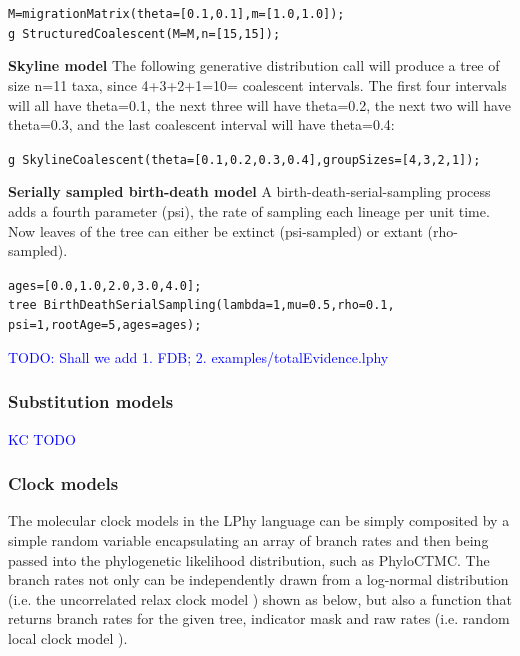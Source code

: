 \documentclass[10pt,letterpaper,table]{article}
\begin{document}
{{\small
  \begin{alltt}
  M = migrationMatrix(theta=[0.1, 0.1], m=[1.0, 1.0]);
  g ~ StructuredCoalescent(M=M, n=[15, 15]);
  \end{alltt}
}

\noindent{} \textbf{Skyline model}
\newline
The following generative distribution call will produce a tree of size
n=11 taxa, since 4+3+2+1=10= coalescent intervals.
The first four intervals will all have theta=0.1, the next three will
have theta=0.2, the next two will have theta=0.3, and the last
coalescent interval will have theta=0.4:

{\small
  \begin{alltt}
    g ~ SkylineCoalescent(theta=[0.1, 0.2, 0.3, 0.4], groupSizes=[4,3,2,1]);
  \end{alltt}
}

\noindent{} \textbf{Serially sampled birth-death model}
\newline
A birth-death-serial-sampling \cite{stadler2013dating} process adds a fourth parameter (psi), the rate of sampling each lineage per unit time.
Now leaves of the tree can either be extinct (psi-sampled) or extant (rho-sampled).
{\small
  \begin{alltt}
    ages = [0.0,1.0,2.0,3.0,4.0];
    tree ~ BirthDeathSerialSampling(lambda=1, mu=0.5, rho=0.1, 
                                    psi=1, rootAge=5, ages=ages);
  \end{alltt}
}

\textcolor{blue}{TODO: Shall we add 1. FDB; 2. examples/totalEvidence.lphy}



\subsubsection{Substitution models}
\textcolor{blue}{KC TODO}


\subsubsection{Clock models}
\label{sec:clockmodels}
The molecular clock models in the LPhy language can be simply composited by a simple random variable encapsulating an array of branch rates and then being passed into the phylogenetic likelihood distribution, such as PhyloCTMC. The branch rates not only can be independently drawn from a log-normal distribution (i.e. the uncorrelated relax clock model \cite{drummond2006relaxedconfidence}) shown as below, but also a function that returns branch rates for the given tree, indicator mask and raw rates (i.e. random local clock model \cite{}). 

}
\end{document}
